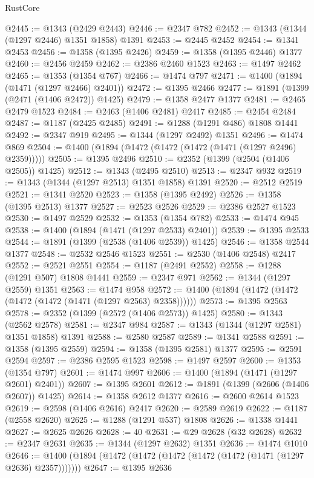 \begin{lexlean}{RustCore}
\begin{coremodule}
{\begin{coremodule}
{{{{{{{{{{{{{{{{{{{{{{{{{{{{{{{{{{{{{{{{{{{{@2445 := @1343 (@2429 @2443)
@2446 := @2347 @782
@2452 := @1343 (@1344 (@1297 @2446) @1351 @1858) @1391
@2453 := @2445 @2452
@2454 := @1341 @2453
@2456 := @1358 (@1395 @2426)
@2459 := @1358 (@1395 @2446) @1377
@2460 := @2456 @2459
@2462 := @2386 @2460 @1523
@2463 := @1497 @2462
@2465 := @1353 (@1354 @767)
@2466 := @1474 @797
@2471 := @1400 (@1894 (@1471 (@1297 @2466) @2401))
@2472 := @1395 @2466
@2477 := @1891 (@1399 (@2471 (@1406 @2472)) @1425)
@2479 := @1358 @2477 @1377
@2481 := @2465 @2479 @1523
@2484 := @2463 (@1406 @2481) @2417
@2485 := @2454 @2484
@2487 := @1187 (@2425 @2485)
@2491 := @1288 (@1291 @486) @1808 @1441
@2492 := @2347 @919
@2495 := @1344 (@1297 @2492) @1351
@2496 := @1474 @869
@2504 := @1400 (@1894 (@1472 (@1472 (@1472 (@1471 (@1297 @2496) @2359)))))
@2505 := @1395 @2496
@2510 := @2352 (@1399 (@2504 (@1406 @2505)) @1425)
@2512 := @1343 (@2495 @2510)
@2513 := @2347 @932
@2519 := @1343 (@1344 (@1297 @2513) @1351 @1858) @1391
@2520 := @2512 @2519
@2521 := @1341 @2520
@2523 := @1358 (@1395 @2492)
@2526 := @1358 (@1395 @2513) @1377
@2527 := @2523 @2526
@2529 := @2386 @2527 @1523
@2530 := @1497 @2529
@2532 := @1353 (@1354 @782)
@2533 := @1474 @945
@2538 := @1400 (@1894 (@1471 (@1297 @2533) @2401))
@2539 := @1395 @2533
@2544 := @1891 (@1399 (@2538 (@1406 @2539)) @1425)
@2546 := @1358 @2544 @1377
@2548 := @2532 @2546 @1523
@2551 := @2530 (@1406 @2548) @2417
@2552 := @2521 @2551
@2554 := @1187 (@2491 @2552)
@2558 := @1288 (@1291 @507) @1808 @1441
@2559 := @2347 @971
@2562 := @1344 (@1297 @2559) @1351
@2563 := @1474 @958
@2572 := @1400 (@1894 (@1472 (@1472 (@1472 (@1472 (@1471 (@1297 @2563) @2358))))))
@2573 := @1395 @2563
@2578 := @2352 (@1399 (@2572 (@1406 @2573)) @1425)
@2580 := @1343 (@2562 @2578)
@2581 := @2347 @984
@2587 := @1343 (@1344 (@1297 @2581) @1351 @1858) @1391
@2588 := @2580 @2587
@2589 := @1341 @2588
@2591 := @1358 (@1395 @2559)
@2594 := @1358 (@1395 @2581) @1377
@2595 := @2591 @2594
@2597 := @2386 @2595 @1523
@2598 := @1497 @2597
@2600 := @1353 (@1354 @797)
@2601 := @1474 @997
@2606 := @1400 (@1894 (@1471 (@1297 @2601) @2401))
@2607 := @1395 @2601
@2612 := @1891 (@1399 (@2606 (@1406 @2607)) @1425)
@2614 := @1358 @2612 @1377
@2616 := @2600 @2614 @1523
@2619 := @2598 (@1406 @2616) @2417
@2620 := @2589 @2619
@2622 := @1187 (@2558 @2620)
@2625 := @1288 (@1291 @537) @1808
@2626 := @1338 @1441
@2627 := @2625 @2626
@2628 := 40
@2631 := @29 @2628 (@32 @2628)
@2632 := @2347 @2631
@2635 := @1344 (@1297 @2632) @1351
@2636 := @1474 @1010
@2646 := @1400 (@1894 (@1472 (@1472 (@1472 (@1472 (@1472 (@1471 (@1297 @2636) @2357)))))))
@2647 := @1395 @2636
}}}}}}}}}}}}}}}}}}}}}}}}}}}}}}}}}}}}}}}}}}}}
\end{coremodule}}
\end{coremodule}
\end{lexlean}
